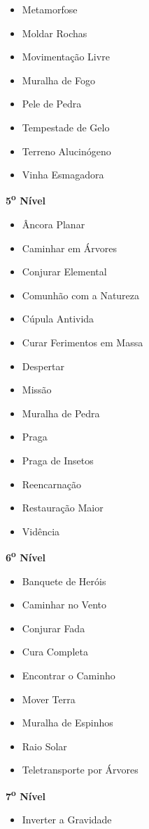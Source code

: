 \documentclass[a4paper,12p]{book}
\begin{document}
\begin{multicols}{4}
{\begin{itemize}
				\item Metamorfose
				\item Moldar Rochas
				\item Movimentação Livre
				\item Muralha de Fogo
				\item Pele de Pedra
				\item Tempestade de Gelo
				\item Terreno Alucinógeno
				\item Vinha Esmagadora
			\end{itemize}
		\textbf{5\textsuperscript{o} Nível}
			\begin{itemize}
				\item Âncora Planar
				\item Caminhar em Árvores
				\item Conjurar Elemental
				\item Comunhão com a Natureza
				\item Cúpula Antivida
				\item Curar Ferimentos em Massa
				\item Despertar
				\item Missão
				\item Muralha de Pedra
				\item Praga
				\item Praga de Insetos
				\item Reencarnação
				\item Restauração Maior
				\item Vidência
			\end{itemize}
		\columnbreak
		\textbf{6\textsuperscript{o} Nível}
			\begin{itemize}
				\item Banquete de Heróis
				\item Caminhar no Vento
				\item Conjurar Fada
				\item Cura Completa
				\item Encontrar o Caminho
				\item Mover Terra
				\item Muralha de Espinhos
				\item Raio Solar
				\item Teletransporte por Árvores
			\end{itemize}
		\textbf{7\textsuperscript{o} Nível}
			\begin{itemize}
				\item Inverter a Gravidade

\end{itemize}}
\end{multicols}
\end{document}

